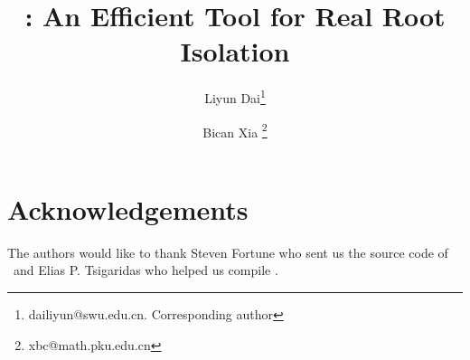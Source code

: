 \documentclass[10pt,a4paper]{article}
\begin{document}
	
	\title{\froot: An Efficient Tool for Real Root Isolation}
		
		\author[1]{Liyun Dai\thanks{dailiyun@swu.edu.cn. Corresponding author}	}
		\author[2]{Bican Xia \thanks{xbc@math.pku.edu.cn}}
	
	\renewcommand\Authands{ and }
\date{}
\maketitle















%
%


\section*{Acknowledgements}
The authors would like to thank Steven Fortune who sent us the source code of \eign\ and Elias P. Tsigaridas who helped us compile \cf.





\end{document}

